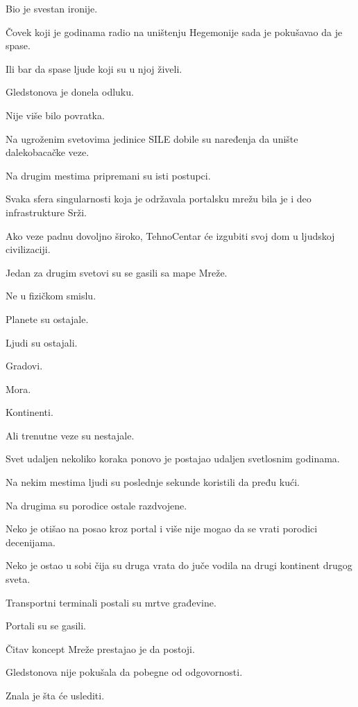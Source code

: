 Bio je svestan ironije.

Čovek koji je godinama radio na uništenju Hegemonije sada je pokušavao da je spase.

Ili bar da spase ljude koji su u njoj živeli.

\bigskip

Gledstonova je donela odluku.

Nije više bilo povratka.

Na ugroženim svetovima jedinice SILE dobile su naređenja da unište dalekobacačke veze.

Na drugim mestima pripremani su isti postupci.

Svaka sfera singularnosti koja je održavala portalsku mrežu bila je i deo infrastrukture Srži.

Ako veze padnu dovoljno široko, TehnoCentar će izgubiti svoj dom u ljudskoj civilizaciji.

\bigskip

Jedan za drugim svetovi su se gasili sa mape Mreže.

Ne u fizičkom smislu.

Planete su ostajale.

Ljudi su ostajali.

Gradovi.

Mora.

Kontinenti.

Ali trenutne veze su nestajale.

Svet udaljen nekoliko koraka ponovo je postajao udaljen svetlosnim godinama.

\bigskip

Na nekim mestima ljudi su poslednje sekunde koristili da pređu kući.

Na drugima su porodice ostale razdvojene.

Neko je otišao na posao kroz portal i više nije mogao da se vrati porodici decenijama.

Neko je ostao u sobi čija su druga vrata do juče vodila na drugi kontinent drugog sveta.

Transportni terminali postali su mrtve građevine.

Portali su se gasili.

\bigskip

Čitav koncept Mreže prestajao je da postoji.

\bigskip

Gledstonova nije pokušala da pobegne od odgovornosti.

Znala je šta će uslediti.


